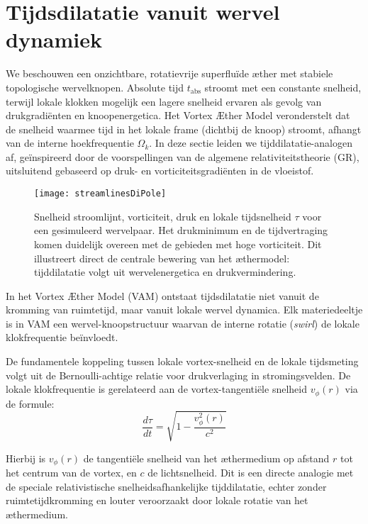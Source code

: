 \section{Tijdsdilatatie vanuit wervel dynamiek}

We beschouwen een onzichtbare, rotatievrije superfluïde æther met stabiele topologische wervelknopen. Absolute tijd $t_{\text{abs}}$ stroomt met een constante snelheid, terwijl lokale klokken mogelijk een lagere snelheid ervaren als gevolg van drukgradiënten en knoopenergetica. Het Vortex Æther Model veronderstelt dat de snelheid waarmee tijd in het lokale frame (dichtbij de knoop) stroomt, afhangt van de interne hoekfrequentie $\Omega_k$. In deze sectie leiden we tijddilatatie-analogen af, geïnspireerd door de voorspellingen van de algemene relativiteitstheorie (GR), uitsluitend gebaseerd op druk- en vorticiteitsgradiënten in de vloeistof.

\begin{figure}[htbp]
\centering
\texttt{[image: streamlinesDiPole]}
\caption{Snelheid stroomlijnt, vorticiteit, druk en lokale tijdsnelheid $\tau$ voor een gesimuleerd wervelpaar. Het drukminimum en de tijdvertraging komen duidelijk overeen met de gebieden met hoge vorticiteit. Dit illustreert direct de centrale bewering van het æthermodel: tijddilatatie volgt uit wervelenergetica en drukvermindering.}
\label{fig:vortexfields}
\end{figure}

In het Vortex Æther Model (VAM) ontstaat tijdsdilatatie niet vanuit de kromming van ruimtetijd, maar vanuit lokale wervel dynamica. Elk materiedeeltje is in VAM een wervel-knoopstructuur waarvan de interne rotatie (\textit{swirl}) de lokale klokfrequentie beïnvloedt.

De fundamentele koppeling tussen lokale vortex-snelheid en de lokale tijdsmeting volgt uit de Bernoulli-achtige relatie voor drukverlaging in stromingsvelden. De lokale klokfrequentie is gerelateerd aan de vortex-tangentiële snelheid $v_{\phi}(r)$ via de formule:
\begin{equation}\label{eq:vortex_tijdsdilatatie}
    \frac{d\tau}{dt} = \sqrt{1 - \frac{v_{\phi}^2(r)}{c^2}}
\end{equation}

Hierbij is $v_{\phi}(r)$ de tangentiële snelheid van het æthermedium op afstand $r$ tot het centrum van de vortex, en $c$ de lichtsnelheid. Dit is een directe analogie met de speciale relativistische snelheidsafhankelijke tijddilatatie, echter zonder ruimtetijdkromming en louter veroorzaakt door lokale rotatie van het æthermedium.

